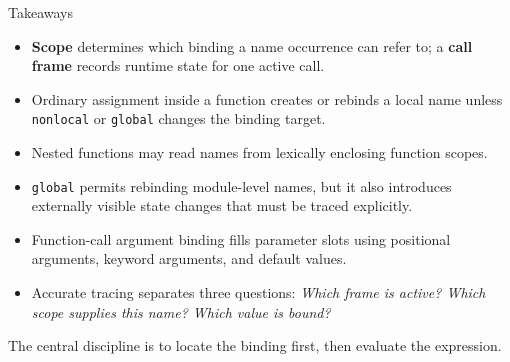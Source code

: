 \documentclass[aspectratio=169,10pt]{beamer}
\begin{document}
\begin{frame}{Takeaways}
  \begin{itemize}
    \item \textbf{Scope} determines which binding a name occurrence can refer to; a \textbf{call frame} records runtime state for one active call.
    \item Ordinary assignment inside a function creates or rebinds a local name unless \texttt{nonlocal} or \texttt{global} changes the binding target.
    \item Nested functions may read names from lexically enclosing function scopes.
    \item \texttt{global} permits rebinding module-level names, but it also introduces externally visible state changes that must be traced explicitly.
    \item Function-call argument binding fills parameter slots using positional arguments, keyword arguments, and default values.
    \item Accurate tracing separates three questions: \emph{Which frame is active? Which scope supplies this name? Which value is bound?}
  \end{itemize}

  \begin{keyidea}
    The central discipline is to locate the binding first, then evaluate the expression.
  \end{keyidea}
\end{frame}
\end{document}
